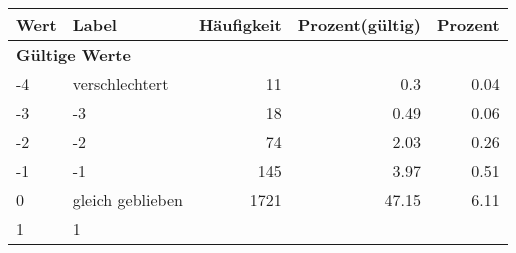      \begin{longtable}{lXrrr}
     \toprule
     \textbf{Wert} & \textbf{Label} & \textbf{Häufigkeit} & \textbf{Prozent(gültig)} & \textbf{Prozent} \\
     \endhead
     \midrule
     \multicolumn{5}{l}{\textbf{Gültige Werte}}\\

     -4 &
     \multicolumn{1}{X}{ verschlechtert   } &


       \num{11} &
       \num[round-mode=places,round-precision=2]{0.3} &
         \num[round-mode=places,round-precision=2]{0.04} \\

     -3 &
     \multicolumn{1}{X}{ -3   } &


       \num{18} &
       \num[round-mode=places,round-precision=2]{0.49} &
         \num[round-mode=places,round-precision=2]{0.06} \\

     -2 &
     \multicolumn{1}{X}{ -2   } &


       \num{74} &
       \num[round-mode=places,round-precision=2]{2.03} &
         \num[round-mode=places,round-precision=2]{0.26} \\

     -1 &
     \multicolumn{1}{X}{ -1   } &


       \num{145} &
       \num[round-mode=places,round-precision=2]{3.97} &
         \num[round-mode=places,round-precision=2]{0.51} \\

     0 &
     \multicolumn{1}{X}{ gleich geblieben   } &


       \num{1721} &
       \num[round-mode=places,round-precision=2]{47.15} &
         \num[round-mode=places,round-precision=2]{6.11} \\

     1 &
     \multicolumn{1}{X}{ 1   } &



\end{longtable}
